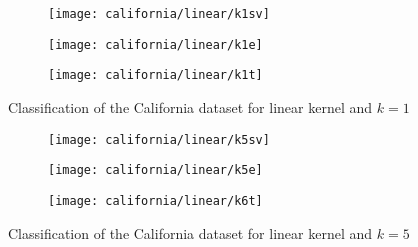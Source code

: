 \documentclass[conference,compsoc]{IEEEtran}
\begin{document}
\begin{figure}[htb]
    \centering %

\begin{subfigure}{0.33\textwidth}
  \texttt{[image: california/linear/k1sv]}
  \label{fig:4}
\end{subfigure}\hfil %
\begin{subfigure}{0.33\textwidth}
  \texttt{[image: california/linear/k1e]}
  \label{fig:5}
\end{subfigure}\hfil %
\begin{subfigure}{0.33\textwidth}
 \texttt{[image: california/linear/k1t]}
  \label{fig:6}
\end{subfigure}
\caption{Classification of the California dataset for linear kernel and $k=1$}


\begin{subfigure}{0.33\textwidth}
  \texttt{[image: california/linear/k5sv]}

  \label{fig:1}
\end{subfigure}\hfil %
\begin{subfigure}{0.33\textwidth}
   \texttt{[image: california/linear/k5e]}

  \label{fig:2}
\end{subfigure}\hfil %
\begin{subfigure}{0.33\textwidth}
 \texttt{[image: california/linear/k6t]}

  \label{fig:3}
  
\end{subfigure}

\caption{Classification of the California dataset for linear kernel and $k=5$}


\label{fig:cal1}
\end{figure}





\clearpage
\newpage

  
  
\end{document}
